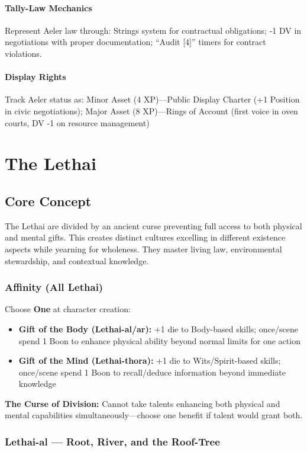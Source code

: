 \documentclass[11pt]{book}
\begin{document}
\subsection*{Tally-Law Mechanics}
Represent Aeler law through: Strings system for contractual obligations; -1 DV in negotiations with proper documentation; ``Audit [4]'' timers for contract violations.

\subsection*{Display Rights}
Track Aeler status as: Minor Asset (4 XP)---Public Display Charter (+1 Position in civic negotiations); Major Asset (8 XP)---Rings of Account (first voice in oven courts, DV -1 on resource management)

\newpage
\part{The Lethai}
\chapter{Core Concept}
The Lethai are divided by an ancient curse preventing full access to both physical and mental gifts. This creates distinct cultures excelling in different existence aspects while yearning for wholeness. They master living law, environmental stewardship, and contextual knowledge.

\section{Affinity (All Lethai)}
Choose \textbf{One} at character creation:
\begin{itemize}
    \item \textbf{Gift of the Body (Lethai-al/ar):} +1 die to Body-based skills; once/scene spend 1 Boon to enhance physical ability beyond normal limits for one action
    \item \textbf{Gift of the Mind (Lethai-thora):} +1 die to Wits/Spirit-based skills; once/scene spend 1 Boon to recall/deduce information beyond immediate knowledge
\end{itemize}
\textbf{The Curse of Division:} Cannot take talents enhancing both physical and mental capabilities simultaneously---choose one benefit if talent would grant both.

\section{Lethai-al --- Root, River, and the Roof-Tree}
\end{document}
